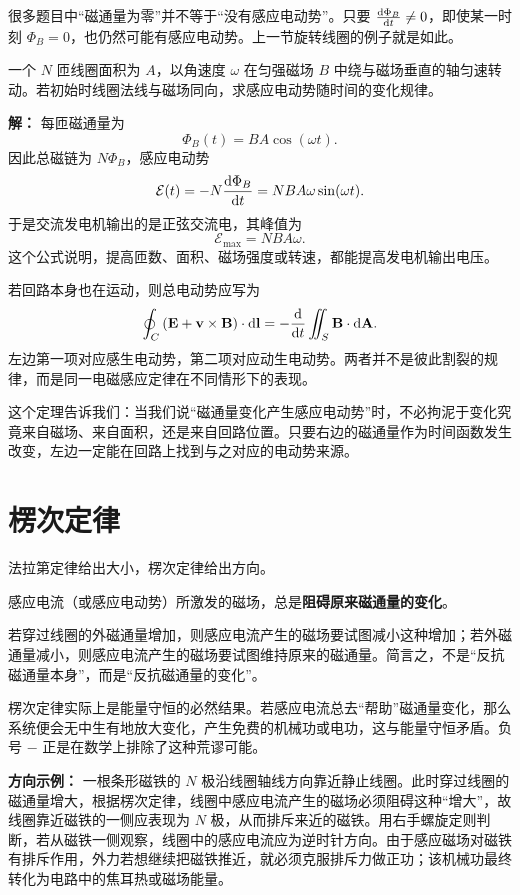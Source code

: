\begin{remark}
很多题目中“磁通量为零”并不等于“没有感应电动势”。只要 $\dv{\Phi_B}{t}\neq 0$，即使某一时刻 $\Phi_B=0$，也仍然可能有感应电动势。上一节旋转线圈的例子就是如此。
\end{remark}

\begin{example}
一个 $N$ 匝线圈面积为 $A$，以角速度 $\omega$ 在匀强磁场 $B$ 中绕与磁场垂直的轴匀速转动。若初始时线圈法线与磁场同向，求感应电动势随时间的变化规律。

\textbf{解：} 每匝磁通量为
\[
\Phi_B(t)=BA\cos(\omega t).
\]
因此总磁链为 $N\Phi_B$，感应电动势
\[
\mathcal{E}(t)=-N\dv{\Phi_B}{t}=NBA\omega \sin(\omega t).
\]
于是交流发电机输出的是正弦交流电，其峰值为
\[
\mathcal{E}_{\max}=NBA\omega.
\]
这个公式说明，提高匝数、面积、磁场强度或转速，都能提高发电机输出电压。
\end{example}

\begin{theorem}[广义法拉第定律]
若回路本身也在运动，则总电动势应写为
\[
\oint_C \left(\vb{E}+\vb{v}\times\vb{B}\right)\cdot \dd \vb{l}
=-\dv{}{t}\iint_S \vb{B}\cdot \dd \vb{A}.
\]
左边第一项对应感生电动势，第二项对应动生电动势。两者并不是彼此割裂的规律，而是同一电磁感应定律在不同情形下的表现。
\end{theorem}

这个定理告诉我们：当我们说“磁通量变化产生感应电动势”时，不必拘泥于变化究竟来自磁场、来自面积，还是来自回路位置。只要右边的磁通量作为时间函数发生改变，左边一定能在回路上找到与之对应的电动势来源。

\section{楞次定律}

法拉第定律给出大小，楞次定律给出方向。

\begin{law}[楞次定律]
感应电流（或感应电动势）所激发的磁场，总是\textbf{阻碍原来磁通量的变化}。
\end{law}

若穿过线圈的外磁通量增加，则感应电流产生的磁场要试图减小这种增加；若外磁通量减小，则感应电流产生的磁场要试图维持原来的磁通量。简言之，不是“反抗磁通量本身”，而是“反抗磁通量的变化”。

楞次定律实际上是能量守恒的必然结果。若感应电流总去“帮助”磁通量变化，那么系统便会无中生有地放大变化，产生免费的机械功或电功，这与能量守恒矛盾。负号 $-$ 正是在数学上排除了这种荒谬可能。

\begin{remark}
\textbf{方向示例：} 一根条形磁铁的 $N$ 极沿线圈轴线方向靠近静止线圈。此时穿过线圈的磁通量增大，根据楞次定律，线圈中感应电流产生的磁场必须阻碍这种“增大”，故线圈靠近磁铁的一侧应表现为 $N$ 极，从而排斥来近的磁铁。用右手螺旋定则判断，若从磁铁一侧观察，线圈中的感应电流应为逆时针方向。由于感应磁场对磁铁有排斥作用，外力若想继续把磁铁推近，就必须克服排斥力做正功；该机械功最终转化为电路中的焦耳热或磁场能量。
\end{remark}

